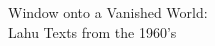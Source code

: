\chapter*{}
\vspace{10em}
\thispagestyle{empty}
\begin{center}
{\fontsize{36}{36}\selectfont Window onto a Vanished World: \\
Lahu Texts from the 1960’s}
\end{center}